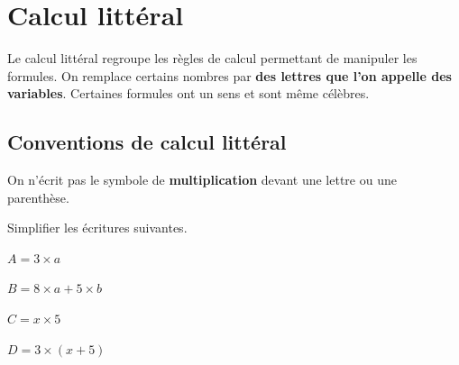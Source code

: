 \documentclass[a4paper]{book}
\begin{document}
\setcounter{chapter}{8}
\renewcommand{\monTitre}{Calcul littéral}
\chapter{\monTitre}
\thispagestyle{fancy} 

Le calcul littéral regroupe les règles de calcul permettant de manipuler les formules. On remplace certains nombres par \textbf{des lettres que l'on appelle des variables}. Certaines formules ont un sens et sont même célèbres. 

\vspace{2cm}

\section{Conventions de calcul littéral}
    

    \begin{convention}
        On n'écrit pas le symbole de \textbf{multiplication} devant une lettre ou une parenthèse.
    \end{convention}


    \begin{exemple}
        Simplifier les écritures suivantes.

        \medskip

        \begin{minipage}{0.24\linewidth}
            $A=3\times a$

            \vspace{1cm}
        \end{minipage}
        \hfill\vline\hfill
        \begin{minipage}{0.24\linewidth}
            $B=8\times a+5\times b$

            \vspace{1cm}
        \end{minipage}
        \hfill\vline\hfill
        \begin{minipage}{0.24\linewidth}
            $C=x\times 5$

            \vspace{1cm}
        \end{minipage}
        \hfill\vline\hfill
        \begin{minipage}{0.24\linewidth}
            $D=3\times (x+5)$

            \vspace{1cm}
        \end{minipage}
    \end{exemple}
\end{document}
